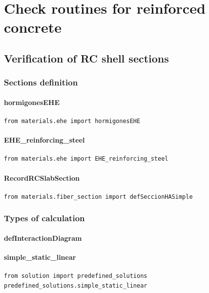 \section{Check routines for reinforced concrete}
\subsection{Verification of RC shell sections}
\subsubsection{Sections definition}
\paragraph{hormigonesEHE}
\begin{verbatim}
from materials.ehe import hormigonesEHE
\end{verbatim}

\paragraph{EHE\_reinforcing\_steel}
\begin{verbatim}
from materials.ehe import EHE_reinforcing_steel
\end{verbatim}

\paragraph{RecordRCSlabSection}
\begin{verbatim}
from materials.fiber_section import defSeccionHASimple
\end{verbatim}


\subsubsection{Types of calculation}
\paragraph{defInteractionDiagram}

\paragraph{simple\_static\_linear}
\begin{verbatim}
from solution import predefined_solutions
predefined_solutions.simple_static_linear
\end{verbatim}

